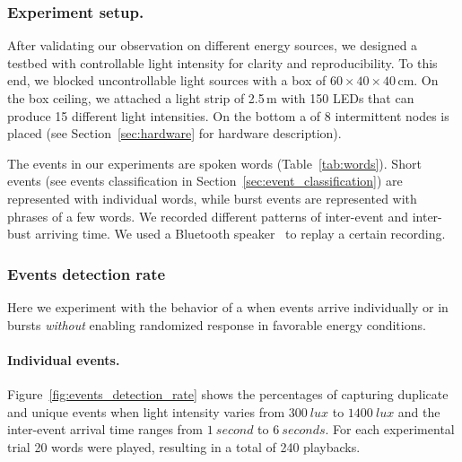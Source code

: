 \subsubsection{Experiment setup.}
\label{sec:experiment_setup}
%
After validating our observation on different energy sources, we designed a testbed with controllable light intensity for clarity and reproducibility. To this end, we blocked uncontrollable light sources with a box of $60 \times 40 \times 40$\,cm. On the box ceiling, we attached a light strip of 2.5\,m with 150 LEDs that can produce 15 different light intensities. On the bottom a \fullCIM of 8 intermittent nodes is placed (see Section~\ref{sec:hardware} for hardware description).

The events in our experiments are spoken words (Table~\ref{tab:words}). 
Short events (see events classification in Section~\ref{sec:event_classification}) are represented with individual words, while burst events are represented with phrases of a few words.
We recorded different patterns of inter-event and inter-bust arriving time. We used a Bluetooth speaker~\cite{jbl} to replay a certain recording. 
%
\subsubsection{Events detection rate}
Here we experiment with the behavior of a \cis when events arrive individually or in bursts \emph{without} enabling  randomized response in favorable energy conditions. 
%
\paragraph{Individual events.}
Figure~\ref{fig:events_detection_rate} shows the percentages of capturing duplicate and unique events when light intensity varies from $\SI{300}{lux}$ to $\SI{1400}{lux}$ and the inter-event arrival time ranges from $\SI{1}{second}$ to $\SI{6}{seconds}$. For each experimental trial 20 words were played, resulting in a total of 240 playbacks. 

